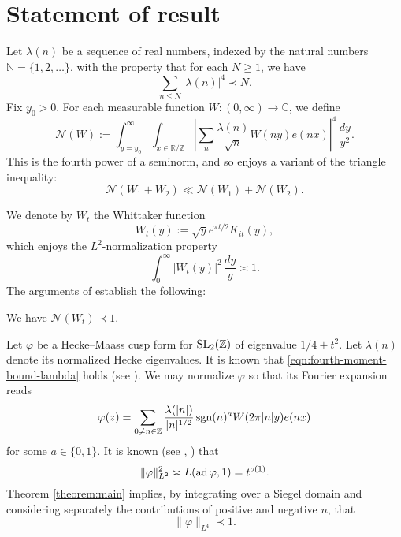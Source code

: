 \documentclass[reqno]{amsart} 
\begin{document}
\section{Statement of result}\label{sec:cqx50az0ci}
Let $\lambda(n)$ be a sequence of real numbers, indexed by the natural numbers $\mathbb{N} = \{1, 2, \dotsc \}$, with the property that for each $N \geq 1$, we have
\begin{equation}\label{eqn:fourth-moment-bound-lambda}
  \sum_{n \leq N} \left\lvert \lambda(n) \right\rvert^4 \prec N.
\end{equation}
Fix $y_0 > 0$.  For each measurable function $W : (0,\infty) \rightarrow \mathbb{C}$, we define
\begin{equation}\label{eqn:definition-N-of-W}
  \mathcal{N} (W) :=
  \int _{y = y _0 } ^\infty
  \int _{x \in \mathbb{R} / \mathbb{Z} }
  \left\lvert
    \sum _{n} \frac{\lambda(n)}{\sqrt{n}} W (n y) e (n x)
  \right\rvert ^4    \, \frac{d y}{ y ^2 }.
\end{equation}
This is the fourth power of a seminorm, and so enjoys a variant of the triangle inequality:
\begin{equation*}
  \mathcal{N} (W _1 + W _2) \ll \mathcal{N} (W _1 ) + \mathcal{N} (W _2 ).
\end{equation*}

We denote by $W_t$ the Whittaker function
\begin{equation*}
  W_t(y) := \sqrt{y} e ^{\pi t / 2} K _{i t} (y),
\end{equation*}
which enjoys the $L^2$-normalization property
\begin{equation*}
  \int _0 ^\infty \lvert W_t(y) \rvert ^2 \, \frac{d y}{y} \asymp 1.
\end{equation*}
The arguments of \cite[Theorem 2]{ki20234} establish the following:
\begin{theorem}\label{theorem:main}
  We have $\mathcal{N}(W_t) \prec 1$.
\end{theorem}

\begin{example}\label{example:cqx50a0rbu}
  Let $\varphi$ be a Hecke--Maass cusp form for $\operatorname{SL}_2(\mathbb{Z})$ of eigenvalue $1/4 + t^2$. Let $\lambda(n)$ denote its normalized Hecke eigenvalues.  It is known  that \eqref{eqn:fourth-moment-bound-lambda} holds (see \cite[Lemma 3.6]{MR3102912}).  We may normalize $\varphi$ so that its Fourier expansion reads
  \begin{equation*}
    \varphi(z) = \sum _{0 \neq n \in \mathbb{Z} }
    \frac{\lambda(|n|)}{|n|^{1/2}}
    \operatorname{sgn}(n)^{a} W (2 \pi |n| y) e (n x)
  \end{equation*}
  for some $a \in \{0,1\}$.  It is known (see \cite{MR1067982}, \cite{HL94}) that
  \begin{equation*}
    \lVert \varphi  \rVert ^2 _{L^2} \asymp L(\operatorname{ad} \varphi, 1) = t^{o(1)}.
  \end{equation*}
  Theorem \ref{theorem:main} implies, by integrating over a Siegel domain and considering separately the contributions of positive and negative $n$, that
  \begin{equation*}
    \lVert \varphi  \rVert _{L^4} \prec 1.
  \end{equation*}
\end{example}
\end{document}
